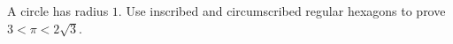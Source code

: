 A circle has radius $1$. Use inscribed and circumscribed regular hexagons to prove $3<\pi<2\sqrt3$.
